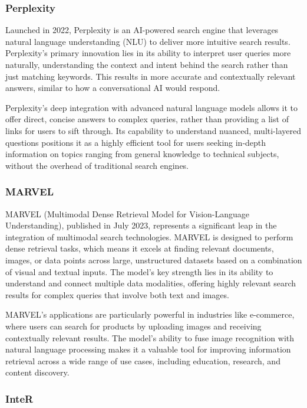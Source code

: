 \subsubsection{Perplexity}

Launched in 2022, Perplexity is an AI-powered search engine that leverages natural language understanding (NLU) to deliver more intuitive search results. 
Perplexity's primary innovation lies in its ability to interpret user queries more naturally, understanding the context and intent behind the search rather than just matching keywords. 
This results in more accurate and contextually relevant answers, similar to how a conversational AI would respond.

Perplexity’s deep integration with advanced natural language models allows it to offer direct, concise answers to complex queries, rather than providing a list of links for users to sift through. 
Its capability to understand nuanced, multi-layered questions positions it as a highly efficient tool for users seeking in-depth information on topics ranging from general knowledge to technical subjects, without the overhead of traditional search engines.

\subsubsection{MARVEL}

MARVEL (Multimodal Dense Retrieval Model for Vision-Language Understanding), published in July 2023, represents a significant leap in the integration of multimodal search technologies. 
MARVEL is designed to perform dense retrieval tasks, which means it excels at finding relevant documents, images, or data points across large, unstructured datasets based on a combination of visual and textual inputs. 
The model’s key strength lies in its ability to understand and connect multiple data modalities, offering highly relevant search results for complex queries that involve both text and images.

MARVEL’s applications are particularly powerful in industries like e-commerce, where users can search for products by uploading images and receiving contextually relevant results. 
The model’s ability to fuse image recognition with natural language processing makes it a valuable tool for improving information retrieval across a wide range of use cases, including education, research, and content discovery.

\subsubsection{InteR}

